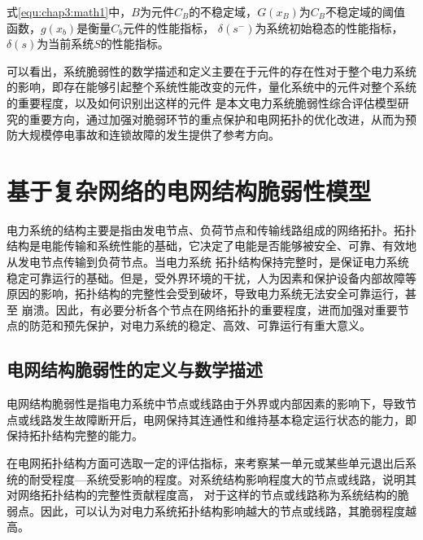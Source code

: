 式\ref{equ:chap3:math1}中，$B$为元件$C_B$的不稳定域，$G\left(x_{B}\right)$为$C_B$不稳定域的阈值函数，$g(x_b)$是衡量$C_b$元件的性能指标，
$\delta\left(s^{-}\right)$为系统初始稳态的性能指标，$\delta\left(s\right)$为当前系统$S$的性能指标。


可以看出，系统脆弱性的数学描述和定义主要在于元件的存在性对于整个电力系统的影响，即存在能够引起整个系统性能改变的元件，量化系统中的元件对整个系统的重要程度，以及如何识别出这样的元件
是本文电力系统脆弱性综合评估模型研究的重要方向，通过加强对脆弱环节的重点保护和电网拓扑的优化改进，从而为预防大规模停电事故和连锁故障的发生提供了参考方向。


\section{基于复杂网络的电网结构脆弱性模型}
\label{sec:construction}

电力系统的结构主要是指由发电节点、负荷节点和传输线路组成的网络拓扑。拓扑结构是电能传输和系统性能的基础，它决定了电能是否能够被安全、可靠、有效地从发电节点传输到负荷节点。当电力系统
拓扑结构保持完整时，是保证电力系统稳定可靠运行的基础。但是，受外界环境的干扰，人为因素和保护设备内部故障等原因的影响，拓扑结构的完整性会受到破坏，导致电力系统无法安全可靠运行，甚至
崩溃。因此，有必要分析各个节点在网络拓扑的重要程度，进而加强对重要节点的防范和预先保护，对电力系统的稳定、高效、可靠运行有重大意义。

\subsection{电网结构脆弱性的定义与数学描述}
\label{sec:network}

电网结构脆弱性是指电力系统中节点或线路由于外界或内部因素的影响下，导致节点或线路发生故障断开后，电网保持其连通性和维持基本稳定运行状态的能力，即保持拓扑结构完整的能力。

在电网拓扑结构方面可选取一定的评估指标，来考察某一单元或某些单元退出后系统的耐受程度—系统受影响的程度。对系统结构影响程度大的节点或线路，说明其对网络拓扑结构的完整性贡献程度高，
对于这样的节点或线路称为系统结构的脆弱点。因此，可以认为对电力系统拓扑结构影响越大的节点或线路，其脆弱程度越高。

